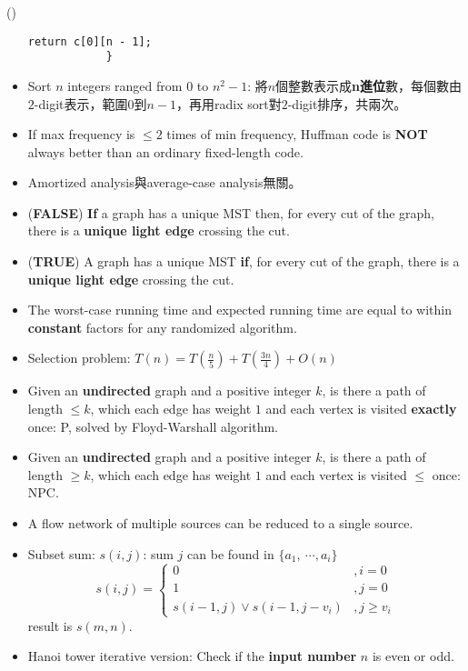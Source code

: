 \begin{theorem}{()}
\begin{itemize}
\begin{lstlisting}[caption={Minimum triangulation.}, captionpos=b]
                return c[0][n - 1];
            }
        \end{lstlisting}
        \item Sort $n$ integers ranged from $0$ to $n^2 - 1$: 將$n$個整數表示成\textbf{n進位}數，每個數由$2$-digit表示，範圍$0$到$n - 1$，再用radix sort對$2$-digit排序，共兩次。
        \item If max frequency is $\le 2$ times of min frequency, Huffman code is \textbf{NOT} always better than an ordinary fixed-length code.
        \item Amortized analysis與average-case analysis無關。
        \item (\textbf{FALSE}) \textbf{If} a graph has a unique MST then, for every cut of the graph, there is a \textbf{unique light edge} crossing the cut.
        \item (\textbf{TRUE}) A graph has a unique MST \textbf{if}, for every cut of the graph, there is a \textbf{unique light edge} crossing the cut.
        \item The worst-case running time and expected running time are equal to within \textbf{constant} factors for any randomized algorithm.
        \item Selection problem: $T(n) = T(\frac{n}{5}) + T(\frac{3n}{4}) + O(n)$
        \item Given an \textbf{undirected} graph and a positive integer $k$, is there a path of length $\le k$, which each edge has weight $1$ and each vertex is visited \textbf{exactly} once: P, solved by Floyd-Warshall algorithm.
        \item Given an \textbf{undirected} graph and a positive integer $k$, is there a path of length $\ge k$, which each edge has weight $1$ and each vertex is visited $\le$ once: NPC.
        \item A flow network of multiple sources can be reduced to a single source.
        \item Subset sum: $s(i, j)$: sum $j$ can be found in $\{a_1, \ \cdots, a_i\}$ \begin{equation}
            s(i, j) = \begin{cases}
                0 &, i = 0 \\
                1 &, j = 0 \\
                s(i - 1, j) \lor s(i - 1, j - v_i) &, j \ge v_i
            \end{cases}
        \end{equation} result is $s(m, n)$.
        \item Hanoi tower iterative version: Check if the \textbf{input number} $n$ is even or odd. \\ 

\end{itemize}
\end{theorem}
